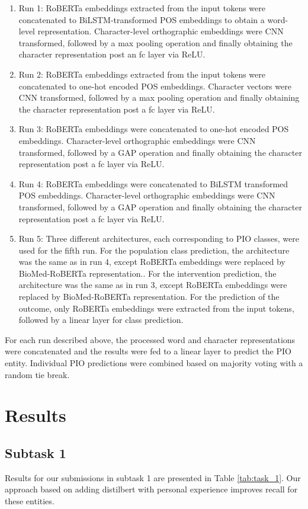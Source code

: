 \documentclass[11pt]{article}
\begin{document}
\begin{enumerate}
    \item Run 1: RoBERTa embeddings extracted from the input tokens were concatenated to BiLSTM-transformed POS embeddings to obtain a word-level representation. Character-level orthographic embeddings were CNN transformed, followed by a max pooling operation and finally obtaining the character representation post an fc layer via ReLU. 
    \item Run 2: RoBERTa embeddings extracted from the input tokens were concatenated to one-hot encoded POS embeddings. Character vectors were CNN transformed, followed by a max pooling operation and finally obtaining the character representation post a fc layer via ReLU.
    \item Run 3: RoBERTa embeddings were concatenated to one-hot encoded POS embeddings. Character-level orthographic embeddings were CNN transformed, followed by a GAP operation and finally obtaining the character representation post a fc layer via ReLU.
    \item Run 4: RoBERTa embeddings were concatenated to BiLSTM transformed POS embeddings. Character-level orthographic embeddings were CNN transformed, followed by a GAP operation and finally obtaining the character representation post a fc layer via ReLU.
    \item Run 5: Three different architectures, each corresponding to PIO classes, were used for the fifth run. For the population class prediction, the architecture was the same as in run 4, except RoBERTa embeddings were replaced by BioMed-RoBERTa representation.. For the intervention prediction, the architecture was the same as in run 3, except RoBERTa embeddings were replaced by BioMed-RoBERTa representation. For the prediction of the outcome, only RoBERTa embeddings were extracted from the input tokens, followed by a linear layer for class prediction. 
\end{enumerate}
%
For each run described above, the processed word and character representations were concatenated and the results were fed to a linear layer to predict the PIO entity.
Individual PIO predictions were combined based on majority voting with a random tie break.
%
%
%
\section{Results}
\label{results}
%
%
%
\subsection{Subtask 1}
\label{res:task1}
%
Results for our submissions in subtask 1 are presented in Table \ref{tab:task_1}. Our approach based on adding distilbert with personal experience improves recall for these entities.
\end{document}
